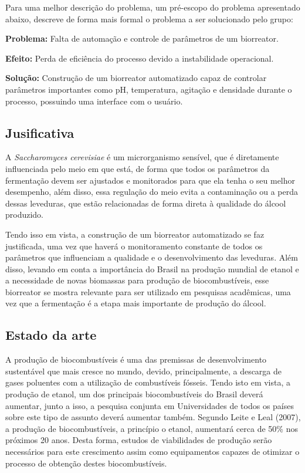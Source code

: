 Para uma melhor descrição do problema, um pré-escopo do problema apresentado abaixo, descreve de forma mais formal o problema a ser solucionado pelo grupo:

\textbf{Problema:} Falta de automação e controle de parâmetros de um biorreator.

\textbf{Efeito:} Perda de eficiência do processo devido a instabilidade operacional.

\textbf{Solução:} Construção de um biorreator automatizado capaz de controlar parâmetros importantes como pH, temperatura, agitação e densidade durante o processo, possuindo uma interface com o usuário.

\subsection{Jusificativa}

A \textit{Saccharomyces cerevisiae} é um microrganismo sensível, que é diretamente influenciada pelo meio em que está, de forma que todos os parâmetros da fermentação devem ser ajustados e monitorados para que ela tenha o seu melhor desempenho, além disso, essa regulação do meio evita a contaminação ou a perda dessas leveduras, que estão relacionadas de forma direta à qualidade do álcool produzido.

Tendo isso em vista, a construção de um biorreator automatizado se faz justificada, uma vez que haverá o monitoramento constante de todos os parâmetros que influenciam a qualidade e o desenvolvimento das leveduras. Além disso, levando em conta a importância do Brasil na produção mundial de etanol e a necessidade de novas biomassas para produção de biocombustíveis, esse biorreator se mostra relevante para ser utilizado em pesquisas acadêmicas, uma vez que a fermentação é a etapa mais importante de produção do álcool.

\subsection{Estado da arte}

A produção de biocombustíveis é uma das premissas de desenvolvimento sustentável que mais cresce no mundo, devido, principalmente, a descarga de gases poluentes com a utilização de combustíveis fósseis. Tendo isto em vista, a produção de etanol, um dos principais biocombustíveis do Brasil deverá aumentar, junto a isso, a pesquisa conjunta em Universidades de todos os países sobre este tipo de assunto deverá aumentar também. Segundo Leite e Leal (2007), a produção de biocombustíveis, a princípio o etanol, aumentará cerca de 50\% nos próximos 20 anos. Desta forma, estudos de viabilidades de produção serão necessários para este crescimento assim como equipamentos capazes de otimizar o processo de obtenção destes biocombustíveis.

